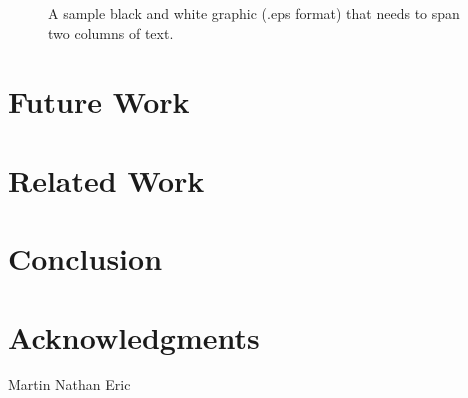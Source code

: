 \documentclass{sig-alternate}
\begin{document}
\begin{figure*}
\centering
{}
\caption{A sample black and white graphic (.eps format)
that needs to span two columns of text.}
\end{figure*}

\section{Future Work}

\section{Related Work}


\section{Conclusion}


\section{Acknowledgments}
Martin
Nathan
Eric


%
%

\balancecolumns
\end{document}
